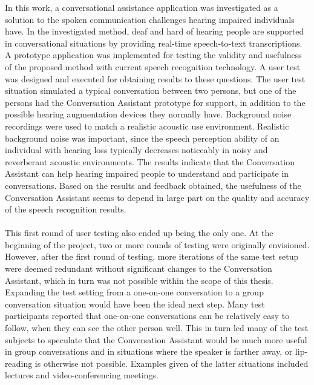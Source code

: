 \documentclass[english, 12pt, a4paper, pdftex, elec, utf8]{aaltothesis}
\begin{document}
In this work, a conversational assistance application was investigated as a solution to the spoken communication challenges hearing impaired individuals have. In the investigated method, deaf and hard of hearing people are supported in conversational situations by providing real-time speech-to-text transcriptions. A prototype application was implemented for testing the validity and usefulness of the proposed method with current speech recognition technology. A user test was designed and executed for obtaining results to these questions. The user test situation simulated a typical conversation between two persons, but one of the persons had the Conversation Assistant prototype for support, in addition to the possible hearing augmentation devices they normally have. Background noise recordings were used to match a realistic acoustic use environment. Realistic background noise was important, since the speech perception ability of an individual with hearing loss typically decreases noticeably in noisy and reverberant acoustic environments. The results indicate that the Conversation Assistant can help hearing impaired people to understand and participate in conversations. Based on the results and feedback obtained, the usefulness of the Conversation Assistant seems to depend in large part on the quality and accuracy of the speech recognition results. \\\\
This first round of user testing also ended up being the only one. At the beginning of the project, two or more rounds of testing were originally envisioned. However, after the first round of testing, more iterations of the same test setup were deemed redundant without significant changes to the Conversation Assistant, which in turn was not possible within the scope of this thesis. Expanding the test setting from a one-on-one conversation to a group conversation situation would have been the ideal next step. Many test participants reported that one-on-one conversations can be relatively easy to follow, when they can see the other person well. This in turn led many of the test subjects to speculate that the Conversation Assistant would be much more useful in group conversations and in situations where the speaker is farther away, or lip-reading is otherwise not possible. Examples given of the latter situations included lectures and video-conferencing meetings. \\\\
\end{document}
